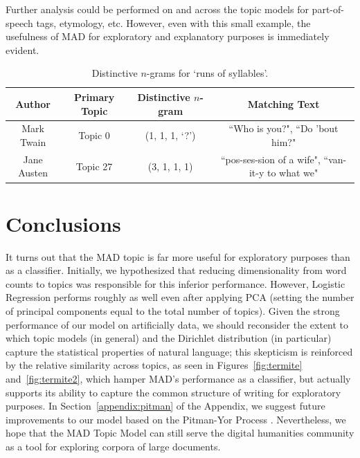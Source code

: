 \documentclass[14pt]{article} %
\theoremstyle{plain}
\theoremstyle{definition}
\theoremstyle{remark}
\begin{document}
Further analysis could be performed on and across the topic models for part-of-speech tags, etymology, etc. However, even with this small example, the usefulness of MAD for exploratory and explanatory purposes is immediately evident.

\begin{table}[ht] 
\centering
\begin{tabular}{ c | c | c | c }
  Author & Primary Topic & Distinctive $n$-gram & Matching Text \\
  \hline
  Mark Twain & Topic 0 & (1, 1, 1, `?') & ``Who is you?", ``Do 'bout him?" \\
  Jane Austen & Topic 27 & (3, 1, 1, 1) & ``pos-ses-sion of a wife", ``van-it-y to what we" \\
\end{tabular}
\caption{Distinctive $n$-grams for `runs of syllables'.}
\label{tab:distinctive_ngrams}
\end{table}

\section{Conclusions}
It turns out that the MAD topic is far more useful for exploratory purposes than as a classifier. Initially, we hypothesized that reducing dimensionality from word counts to topics was responsible for this inferior performance. However, Logistic Regression performs roughly as well even after applying PCA (setting the number of principal components equal to the total number of topics). Given the strong performance of our model on artificially data, we should reconsider the extent to which topic models (in general) and the Dirichlet distribution (in particular) capture the statistical properties of natural language; this skepticism is reinforced by the relative similarity across topics, as seen in Figures~\ref{fig:termite} and~\ref{fig:termite2}, which hamper MAD's performance as a classifier, but actually supports its ability to capture the common structure of writing for exploratory purposes. In Section~\ref{appendix:pitman} of the Appendix, we suggest future improvements to our model based on the Pitman-Yor Process \cite{teh2006hierarchical}. Nevertheless, we hope that the MAD Topic Model can still serve the digital humanities community as a tool for exploring corpora of large documents.

\newpage
\end{document}
